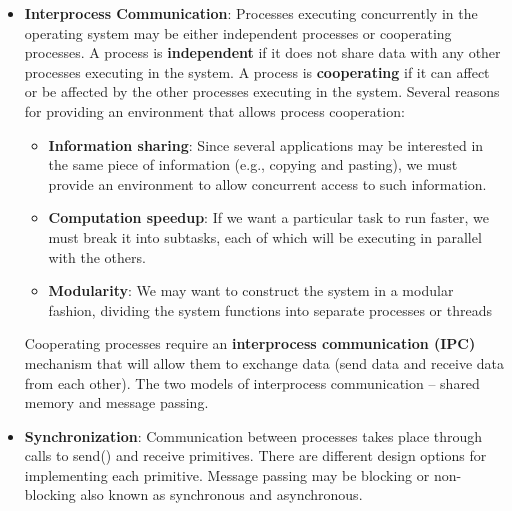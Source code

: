 \documentclass{report}
\begin{document}
\begin{itemize}
            \bigbreak \noindent 
            The parent needs to know the identity of the child in order to terminate them, thus the pid of the child is returned to the parent. Such systems do not allow a child to exist if its parent has terminated. If a process terminates, then all its children must also terminate.
            \bigbreak \noindent 
            This is referred to as \textbf{cascading termination}. It is normally initiated by the operating system.
        \item \textbf{Interprocess Communication}: Processes executing concurrently in the operating system may be either independent processes or cooperating processes.
            \bigbreak \noindent 
            A process is \textbf{independent} if it does not share data with any other processes executing in the system.
            \bigbreak \noindent 
            A process is \textbf{cooperating} if it can affect or be affected by the other processes executing in the system.
            \bigbreak \noindent 
            Several reasons for providing an environment that allows process cooperation:
            \begin{itemize}
                \item \textbf{Information sharing}: Since several applications may be interested in the same piece of information (e.g., copying and pasting), we must provide an environment to allow concurrent access to such information.
                \item \textbf{Computation speedup}: If we want a particular task to run faster, we must break it into subtasks, each of which will be executing in parallel with the others.
                \item \textbf{Modularity}: We may want to construct the system in a modular fashion, dividing the system functions into separate processes or threads
            \end{itemize}
            Cooperating processes require an \textbf{interprocess communication (IPC)} mechanism that will allow them to exchange data (send data and receive data from each other).
            \bigbreak \noindent 
            The two models of interprocess communication – shared memory and message passing.
        \item \textbf{Synchronization}: Communication between processes takes place through calls to send() and receive primitives. There are different design options for implementing each primitive.
            \bigbreak \noindent 
            Message passing may be blocking or non-blocking also known as synchronous and asynchronous.

\end{itemize}
\end{document}
